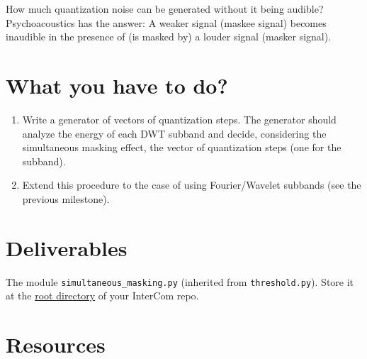 How much quantization noise can be generated without it being audible?
Psychoacoustics has the answer: A weaker signal (maskee signal) becomes
inaudible in the presence of (is masked by) a louder signal (masker signal). 

\section{What you have to do?}

\begin{enumerate}
\item Write a generator of vectors of quantization steps. The
  generator should analyze the energy of each DWT subband and decide,
  considering the simultaneous masking effect, the vector of
  quantization steps (one for the subband).
\item Extend this procedure to the case of using Fourier/Wavelet
  subbands (see the previous milestone).
\end{enumerate}

\section{Deliverables}

The module \verb|simultaneous_masking.py| (inherited from
\verb|threshold.py|). Store it at the
\href{https://github.com/Tecnologias-multimedia/intercom}{root
  directory} of your InterCom repo.

\section{Resources}




